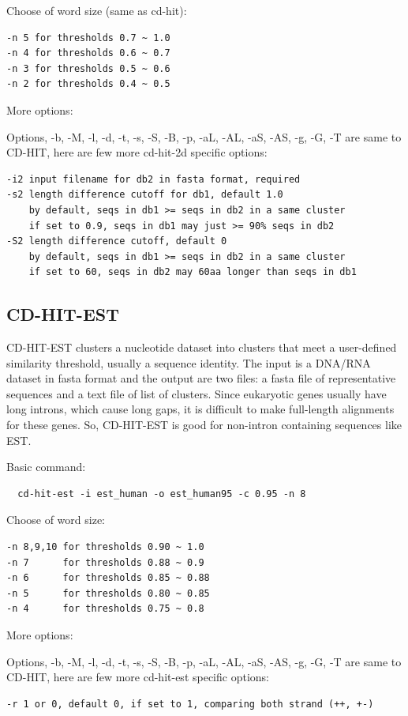 \documentclass[12pt,a4paper]{article}
\begin{document}
Choose of word size (same as cd-hit):
\begin{lstlisting}
-n 5 for thresholds 0.7 ~ 1.0
-n 4 for thresholds 0.6 ~ 0.7
-n 3 for thresholds 0.5 ~ 0.6
-n 2 for thresholds 0.4 ~ 0.5 
\end{lstlisting}

More options:

Options, -b, -M, -l, -d, -t, -s, -S, -B, -p, -aL, -AL, -aS, -AS, -g, -G, -T
are same to CD-HIT, here are few more cd-hit-2d specific options:
\begin{lstlisting}
-i2 input filename for db2 in fasta format, required
-s2 length difference cutoff for db1, default 1.0
    by default, seqs in db1 >= seqs in db2 in a same cluster
    if set to 0.9, seqs in db1 may just >= 90% seqs in db2
-S2 length difference cutoff, default 0
    by default, seqs in db1 >= seqs in db2 in a same cluster
    if set to 60, seqs in db2 may 60aa longer than seqs in db1
\end{lstlisting}

\subsection{CD-HIT-EST }

CD-HIT-EST clusters a nucleotide dataset into clusters that meet a
user-defined similarity threshold, usually a sequence identity. The input is
a DNA/RNA dataset in fasta format and the output are two files: a fasta file
of representative sequences and a text file of list of clusters. 
Since eukaryotic genes usually have long introns, which cause long gaps, it is
difficult to make full-length alignments for these genes. So, CD-HIT-EST is
good for non-intron containing sequences like EST.  

Basic command:

\begin{lstlisting}
  cd-hit-est -i est_human -o est_human95 -c 0.95 -n 8  
\end{lstlisting}

Choose of word size:
\begin{lstlisting}
-n 8,9,10 for thresholds 0.90 ~ 1.0
-n 7      for thresholds 0.88 ~ 0.9
-n 6      for thresholds 0.85 ~ 0.88
-n 5      for thresholds 0.80 ~ 0.85
-n 4      for thresholds 0.75 ~ 0.8 
\end{lstlisting}

More options:

Options, -b, -M, -l, -d, -t, -s, -S, -B, -p, -aL, -AL, -aS, -AS, -g, -G, -T
are same to CD-HIT, here are few more cd-hit-est specific options:
\begin{lstlisting}
-r 1 or 0, default 0, if set to 1, comparing both strand (++, +-)
\end{lstlisting}
\end{document}
